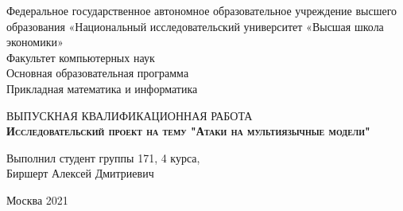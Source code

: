 \begin{titlepage}
    \newpage

    {
    \begin{center}
        Федеральное государственное автономное образовательное учреждение высшего образования «Национальный исследовательский университет «Высшая школа экономики»
        \\
        \bigskip
        Факультет компьютерных наук \\
        Основная образовательная программа \\
        Прикладная математика и информатика \\
    \end{center}
    }

    \vspace{8em}

    \begin{center}
    {\Large ВЫПУСКНАЯ КВАЛИФИКАЦИОННАЯ РАБОТА}
        \\
        \textsc{\textbf{
            Исследовательский проект на тему
            \linebreak
            "Атаки на мультиязычные модели"}}
    \end{center}

    \vspace{2em}

    {
    \hfill\parbox{16cm}{
        \hspace*{5cm}\hspace*{-5cm}Выполнил студент группы 171, 4 курса,\\
        Биршерт Алексей Дмитриевич
    }
    }

    \vspace{\fill}

    \begin{center}
        Москва 2021
    \end{center}

\end{titlepage}